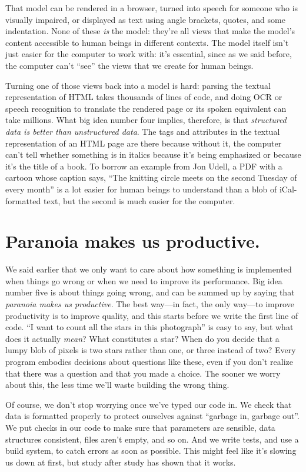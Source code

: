 \documentclass[10pt,letterpaper]{article}
\newcommand{\rulemajor}[1]{\section{#1}}
\begin{document}
That model can be rendered in a browser, turned into speech for someone who is
visually impaired, or displayed as text using angle brackets, quotes, and some
indentation.  None of these \emph{is} the model: they're all views that make the
model's content accessible to human beings in different contexts.  The model
itself isn't just easier for the computer to work with: it's essential, since as
we said before, the computer can't ``see'' the views that we create for human
beings.

Turning one of those views back into a model is hard: parsing the textual
representation of HTML takes thousands of lines of code, and doing OCR or speech
recognition to translate the rendered page or its spoken equivalent can take
millions.  What big idea number four implies, therefore, is that
\emph{structured data is better than unstructured data}.  The tags and
attributes in the textual representation of an HTML page are there because
without it, the computer can't tell whether something is in italics because it's
being emphasized or because it's the title of a book.  To borrow an example from
Jon Udell, a PDF with a cartoon whose caption says, ``The knitting circle meets
on the second Tuesday of every month'' is a lot easier for human beings to
understand than a blob of iCal-formatted text, but the second is much easier for
the computer.

\rulemajor{Paranoia makes us productive.}

We said earlier that we only want to care about how something is implemented
when things go wrong or when we need to improve its performance.  Big idea
number five is about things going wrong, and can be summed up by saying that
\emph{paranoia makes us productive}.  The best way---in fact, the only way---to
improve productivity is to improve quality, and this starts before we write the
first line of code.  ``I want to count all the stars in this photograph'' is
easy to say, but what does it actually \emph{mean}?  What constitutes a star?
When do you decide that a lumpy blob of pixels is two stars rather than one, or
three instead of two?  Every program embodies decisions about questions like
these, even if you don't realize that there was a question and that you made a
choice.  The sooner we worry about this, the less time we'll waste building the
wrong thing.

Of course, we don't stop worrying once we've typed our code in.  We check that
data is formatted properly to protect ourselves against ``garbage in, garbage
out''.  We put checks in our code to make sure that parameters are sensible, data
structures consistent, files aren't empty, and so on.  And we write tests, and
use a build system, to catch errors as soon as possible.  This might feel like
it's slowing us down at first, but study after study has shown that it works.
\end{document}
